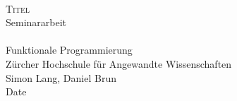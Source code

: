 




\begin{titlepage}
   \mbox{}\vspace{5\baselineskip}\\
   \rmfamily\huge
   \centering
   \textsc{Titel} \\[2ex]
   Seminararbeit
   \rmfamily\Large
   \vspace{1\baselineskip}\\
   \mbox{}
   \vspace{3\baselineskip}\\
   Funktionale Programmierung\\
   Zürcher Hochschule für Angewandte Wissenschaften
   \vspace{5\baselineskip}\\
   \rmfamily\Large
   Simon Lang, Daniel Brun
   \vspace{1\baselineskip}\\
   Date
\end{titlepage}
 



% 
